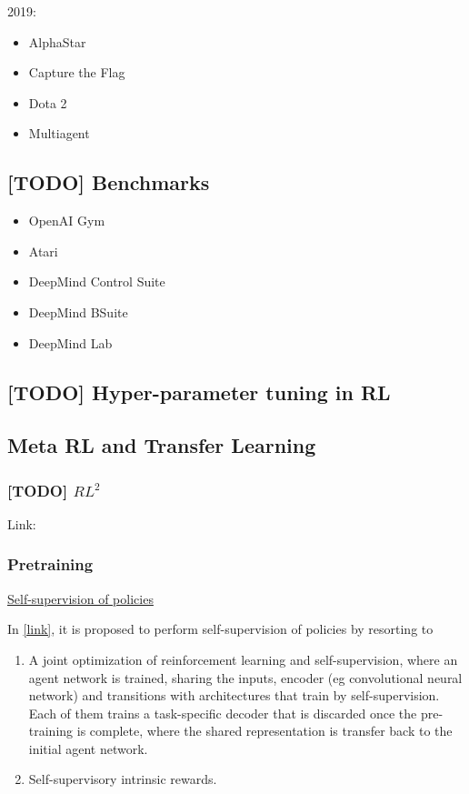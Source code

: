 \documentclass[12pt, english]{article}
\begin{document}
2019: \begin{itemize}
  \item AlphaStar \cite{}
  \item Capture the Flag \cite{}
  \item Dota 2 \cite{}
  \item Multiagent \cite{}
\end{itemize}


\subsection{[TODO] Benchmarks}

\begin{itemize}
  \item OpenAI Gym
  \item Atari
  \item DeepMind Control Suite
  \item DeepMind BSuite
  \item DeepMind Lab
\end{itemize}

\subsection{[TODO] Hyper-parameter tuning in RL}



\subsection{Meta RL and Transfer Learning}

\subsubsection{[TODO] $RL^2$}

Link: \url{}

\subsubsection{Pretraining}

\underline{Self-supervision of policies}

In \cite{shelhamer_loss_2017} \href{https://arxiv.org/abs/1612.07307}{[link]}, it is proposed to perform self-supervision of policies by resorting to

\begin{enumerate}
  \item A joint optimization of reinforcement learning and self-supervision, where an agent network is trained, sharing the inputs, encoder (eg convolutional neural network) and transitions with architectures that train by self-supervision. Each of them trains a task-specific decoder that is discarded once the pre-training is complete, where the shared representation is transfer back to the initial agent network.
  \item Self-supervisory intrinsic rewards.
\end{enumerate}
\end{document}
